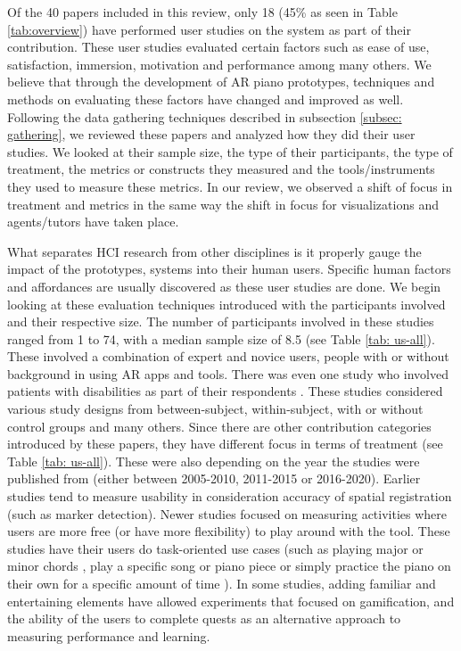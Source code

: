 \documentclass[sigchi, review]{acmart}
\begin{document}
Of the 40 papers included in this review, only 18 (45\% as seen in Table \ref{tab:overview}) have performed user studies on the system  as part of their contribution. These user studies evaluated certain factors such as ease of use, satisfaction, immersion, motivation and performance among many others. We believe that through the development of AR piano prototypes, techniques and methods on evaluating these factors have changed and improved as well. Following the data gathering techniques described in subsection \ref{subsec: gathering}, we reviewed these papers and analyzed how they did their user studies. We looked at their sample size, the type of their participants, the type of treatment, the metrics or constructs they measured and the tools/instruments they used to measure these metrics. In our review, we observed a shift of focus in treatment and metrics in the same way the shift in focus for visualizations and agents/tutors have taken place. 

What separates HCI research from other disciplines is it properly gauge the impact of the prototypes, systems into their human users. Specific human factors and affordances are usually discovered as these user studies are done. We begin looking at these evaluation techniques introduced with the participants involved and their respective size. The number of participants involved in these studies ranged from 1 to 74, with a median sample size of 8.5 (see Table \ref{tab: us-all}). These involved a combination of expert and novice users, people with or without background in using AR apps and tools. There was even one study who involved patients with disabilities as part of their respondents \cite{correa2009computer}. These studies considered various study designs from between-subject, within-subject, with or without control groups and many others. Since there are other contribution categories introduced by these papers, they have different focus in terms of treatment (see Table \ref{tab: us-all}). These were also depending on the year the studies were published from (either between 2005-2010, 2011-2015 or 2016-2020). Earlier studies tend to measure usability in consideration accuracy of spatial registration (such as marker detection). Newer studies focused on measuring activities where users are more free (or have more flexibility) to play around with the tool. These studies have their users do task-oriented use cases (such as playing major or minor chords \cite{nugraha2014pemanfaatan, xiao2010mirrorfugue}, play a specific song or piano piece \cite{chow2013music, sandnes2019enhanced,pan2018pilot} or simply practice the piano on their own for a specific amount of time \cite{weing2013piano, raymaekers2014game}). In some studies, adding familiar and entertaining elements have allowed experiments that focused on gamification, and the ability of the users to complete quests as an alternative approach to measuring performance and learning. 
\end{document}
